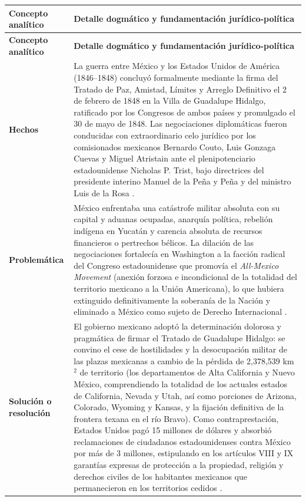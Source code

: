 \documentclass[12pt,spanish,letterpaper,oneside]{article}
\begin{document}
\begin{center}
\small
\begin{longtable}{|L{4.2cm}|L{11.6cm}|}
\hline
{}
\textbf{Concepto anal\'itico} & \textbf{Detalle dogm\'atico y fundamentaci\'on jur\'idico-pol\'itica} \\
\hline
\endfirsthead
\hline
{}
\textbf{Concepto anal\'itico} & \textbf{Detalle dogm\'atico y fundamentaci\'on jur\'idico-pol\'itica} \\
\hline
\endhead

\textbf{Hechos} & 
La guerra entre M\'exico y los Estados Unidos de Am\'erica (1846--1848) concluy\'o formalmente mediante la firma del Tratado de Paz, Amistad, L\'imites y Arreglo Definitivo el 2 de febrero de 1848 en la Villa de Guadalupe Hidalgo, ratificado por los Congresos de ambos pa\'ises y promulgado el 30 de mayo de 1848. Las negociaciones diplom\'aticas fueron conducidas con extraordinario celo jur\'idico por los comisionados mexicanos Bernardo Couto, Luis Gonzaga Cuevas y Miguel Atristain ante el plenipotenciario estadounidense Nicholas P. Trist, bajo directrices del presidente interino Manuel de la Pe\~na y Pe\~na y del ministro Luis de la Rosa \citep[pp.~75--92]{guadalupeHidalgo1848,vazquez1997}. \\\hline

\textbf{Problem\'atica} & 
M\'exico enfrentaba una cat\'astrofe militar absoluta con su capital y aduanas ocupadas, anarqu\'ia pol\'itica, rebeli\'on ind\'igena en Yucat\'an y carencia absoluta de recursos financieros o pertrechos b\'elicos. La dilaci\'on de las negociaciones fortalec\'ia en Washington a la facci\'on radical del Congreso estadounidense que promov\'ia el \emph{All-Mexico Movement} (anexi\'on forzosa e incondicional de la totalidad del territorio mexicano a la Uni\'on Americana), lo que hubiera extinguido definitivamente la soberan\'ia de la Naci\'on y eliminado a M\'exico como sujeto de Derecho Internacional \citep[pp.~88--105]{bosch1992,silvaHerzog1993}. \\\hline

\textbf{Soluci\'on o resoluci\'on} & 
El gobierno mexicano adopt\'o la determinaci\'on dolorosa y pragm\'atica de firmar el Tratado de Guadalupe Hidalgo: se convino el cese de hostilidades y la desocupaci\'on militar de las plazas mexicanas a cambio de la p\'erdida de 2,378,539 km$^2$ de territorio (los departamentos de Alta California y Nuevo M\'exico, comprendiendo la totalidad de los actuales estados de California, Nevada y Utah, as\'i como porciones de Arizona, Colorado, Wyoming y Kansas, y la fijaci\'on definitiva de la frontera texana en el r\'io Bravo). Como contraprestaci\'on, Estados Unidos pag\'o 15 millones de d\'olares y absorbi\'o reclamaciones de ciudadanos estadounidenses contra M\'exico por m\'as de 3 millones, estipulando en los art\'iculos VIII y IX garant\'ias expresas de protecci\'on a la propiedad, religi\'on y derechos civiles de los habitantes mexicanos que permanecieron en los territorios cedidos \citep[pp.~110--125]{guadalupeHidalgo1848,rabasa2012}. \\\hline


\end{longtable}
\end{center}
\end{document}
